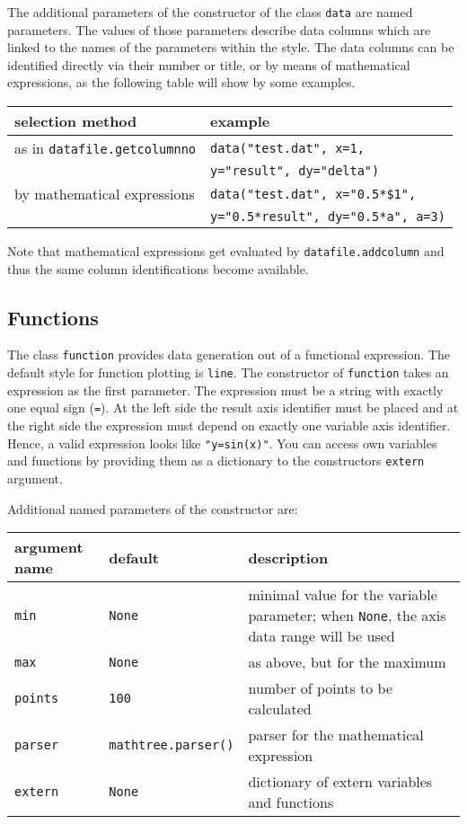 The additional parameters of the constructor of the class \verb|data|
are named parameters. The values of those parameters describe data
columns which are linked to the names of the parameters within the
style. The data columns can be identified directly via their number or
title, or by means of mathematical expressions, as the following table
will show by some examples.

\begin{center}
\begin{tabular}{ll}
selection method&example\\
\hline
as in \texttt{datafile.getcolumnno}&\texttt{data("test.dat", x=1,}\\
&\texttt{\hphantom{data(}y="result", dy="delta")}\\
by mathematical expressions&\texttt{data("test.dat", x="0.5*\$1",}\\
&\texttt{\hphantom{data(}y="0.5*result", dy="0.5*a", a=3)}\\
\end{tabular}
\end{center}

Note that mathematical expressions get evaluated by
\verb|datafile.addcolumn| and thus the same column identifications
become available.

\subsection{Functions}

The class \verb|function| provides data generation out of a functional
expression. The default style for function plotting is \verb|line|.
The constructor of \verb|function| takes an expression as the first
parameter. The expression must be a string with exactly one equal sign
(\verb|=|). At the left side the result axis identifier must be placed
and at the right side the expression must depend on exactly one
variable axis identifier. Hence, a valid expression looks like
\verb|"y=sin(x)"|. You can access own variables and functions by
providing them as a dictionary to the constructors \verb|extern|
argument.

Additional named parameters of the constructor are:

\medskip
\begin{tabularx}{\linewidth}{ll>{\raggedright\arraybackslash}X}
argument name&default&description\\
\hline
\texttt{min}&\texttt{None}&minimal value for the variable parameter; when \texttt{None}, the axis data range will be used\\
\texttt{max}&\texttt{None}&as above, but for the maximum\\
\texttt{points}&\texttt{100}&number of points to be calculated\\
\texttt{parser}&\texttt{mathtree.parser()}&parser for the mathematical expression\\
\texttt{extern}&\texttt{None}&dictionary of extern variables and functions\\
\end{tabularx}
\medskip

